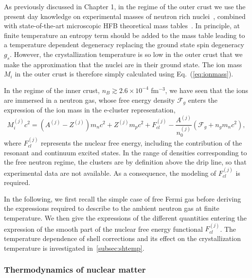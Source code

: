 As previously discussed in Chapter 1, in the regime of the outer crust we use 
the present day knowledge on experimental masses of neutron rich 
nuclei~\cite{Huang2017,Welker2017}, combined with state-of-the-art 
microscopic HFB theoretical mass tables~\cite{Goriely2013}. 
In principle, at finite temperature an entropy term should be added to the mass
table leading to a temperature dependent degeneracy replacing the ground state
spin degeneracy $g_s$. However, the crystallization temperature is so low in
the outer crust that we make the approximation that the nuclei are in their
ground state. 
The ion mass $M_{i}$ in the outer crust is therefore simply calculated using 
Eq.~(\ref{eq:ionmass}).

In the regime of the inner crust, $n_B \gtrsim 2.6 \times 10^{-4}$ fm$^{-3}$, 
we have seen that the ions are immersed in a neutron gas, whose free energy 
density $\mathcal{F}_g$ enters the expression of the ion mass in the e-cluster 
representation,
%
\begin{equation}
  M_{i}^{(j)} c^2 = (A^{(j)} - Z^{(j)})m_n c^2 + Z^{(j)} m_p c^2 
  + F_{cl}^{(j)} - \frac{A^{(j)}}{n_0^{(j)}}(\mathcal{F}_g + n_g m_n c^2),
\end{equation}
%
where $F_{cl}^{(j)}$ represents the nuclear free energy, including the
contribution of the resonant and continuum excited states.
In the range of densities corresponding to the free neutron regime, the 
clusters are by definition above the drip line, so that experimental data are 
not available. As a consequence, the modeling of $F_{cl}^{(j)}$ is required.

In the following, we first recall the simple case of free Fermi gas before
deriving the expressions required to describe to the ambient neutron gas at 
finite temperature. 
We then give the expressions of the different quantities entering the 
expression of the smooth part of the nuclear free energy functional 
$F_{cl}^{(j)}$. The temperature dependence of shell corrections and its effect 
on the crystallization temperature is investigated in~\ref{subsec:shtemp}.

\subsubsection{Thermodynamics of nuclear matter}

